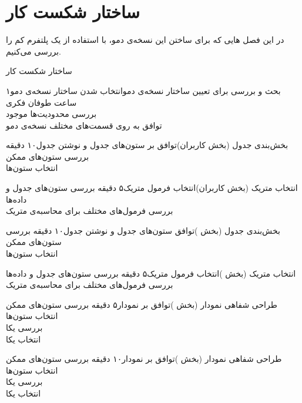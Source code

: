 \chapter{ساختار شکست کار}
در این فصل 
هایی
که برای ساختن این نسخه‌ی دمو، با استفاده از یک پلتفرم کم را بررسی می‌کنیم.

\begin{wbsbox}{ساختار شکست کار}
\begin{wbssub}{بحث و بررسی برای تعیین ساختار نسخه‌ی دمو}{انتخاب شدن ساختار نسخه‌ی دمو}{۱ ساعت}
\task
طوفان فکری \\
\task 
بررسی محدودیت‌ها موجود \\
\task
توافق به روی قسمت‌های مختلف نسخه‌ی دمو
\end{wbssub}

\begin{wbssub}{بخش‌بندی جدول (بخش کاربران)}{توافق بر ستون‌های جدول و نوشتن جدول}{۱۰ دقیقه}
\task بررسی ستون‌های ممکن \\
\task انتخاب ستون‌ها
\end{wbssub}

\begin{wbssub}{انتخاب متریک (بخش کاربران)}{انتخاب فرمول متریک}{۵ دقیقه}
\task بررسی ستون‌های جدول و داده‌ها\\
\task بررسی فرمول‌های مختلف ‌برای محاسبه‌ی متریک
\end{wbssub}

\begin{wbssub}{بخش‌بندی جدول (بخش )}{توافق ستون‌های جدول و نوشتن جدول}{۱۰ دقیقه}
\task بررسی ستون‌های ممکن \\
\task انتخاب ستون‌ها
\end{wbssub}

\begin{wbssub}{انتخاب متریک (بخش )}{انتخاب فرمول متریک}{۵ دقیقه}
\task بررسی ستون‌های جدول و داده‌ها\\
\task بررسی فرمول‌های مختلف ‌برای محاسبه‌ی متریک
\end{wbssub}

\begin{wbssub}{طراحی شفاهی نمودار (بخش )}{توافق بر نمودار}{۵ دقیقه}
\task بررسی ستون‌های ممکن \\
\task انتخاب ستون‌ها \\
\task بررسی یکا \\
\task انتخاب یکا
\end{wbssub}

\begin{wbssub}{طراحی شفاهی نمودار (بخش )}{توافق بر نمودار}{۱۰ دقیقه}
\task بررسی ستون‌های ممکن \\
\task انتخاب ستون‌ها \\
\task بررسی یکا \\
\task انتخاب یکا
\end{wbssub}


\end{wbsbox}
